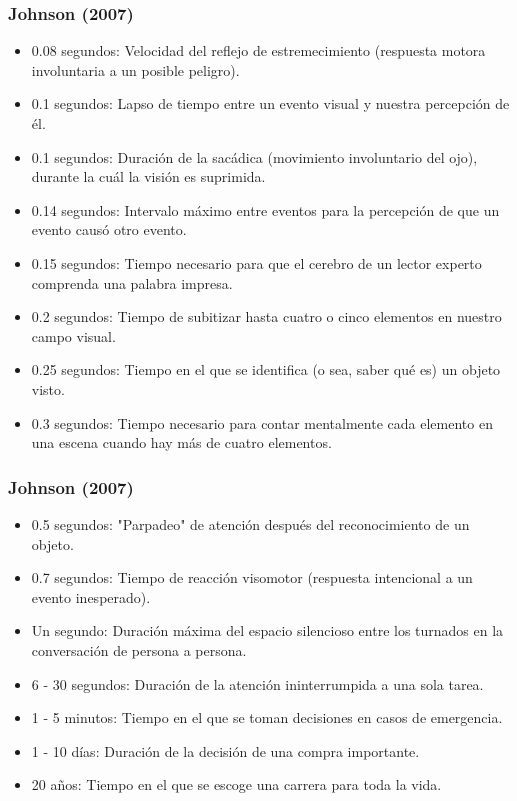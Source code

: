 \documentclass[11pt]{beamer}
\begin{document}
\begin{frame}
\frametitle{Johnson (2007)}
\begin{itemize}
\par
    \par
    \justify
    \color{black}
    \begin{itemize}
    \item 0.08 segundos: Velocidad del reflejo de estremecimiento (respuesta motora involuntaria a un posible peligro).
    \item  0.1 segundos: Lapso de tiempo entre un evento visual y nuestra percepción de él.
    \item 0.1 segundos: Duración de la sacádica (movimiento involuntario del ojo), durante la cuál la visión es suprimida.
    \item 0.14 segundos: Intervalo máximo entre eventos para la percepción de que un evento causó otro evento.
    \item 0.15 segundos: Tiempo necesario para que el cerebro de un lector experto comprenda una palabra impresa.
    \item 0.2 segundos: Tiempo de subitizar hasta cuatro o cinco elementos en nuestro campo visual. 
    \item 0.25 segundos: Tiempo en el que se identifica (o sea, saber qué es) un objeto visto.
    \item 0.3 segundos: Tiempo necesario para contar mentalmente cada elemento en una escena cuando hay más de cuatro elementos.
    
    \end{itemize}
\end{itemize}
\end{frame}

\begin{frame}
\frametitle{Johnson (2007)}
\begin{itemize}
\par
    \par
    \justify
    \color{black}
    \begin{itemize}
    \item 0.5 segundos: "Parpadeo" de atención después del reconocimiento de un objeto.
    \item 0.7 segundos: Tiempo de reacción visomotor (respuesta intencional a un evento inesperado).
    \item Un segundo: Duración máxima del espacio silencioso entre los turnados en la conversación de persona a persona.
    \item 6 - 30 segundos: Duración de la atención ininterrumpida a una sola tarea.
    \item 1 - 5 minutos: Tiempo en el que se toman decisiones en casos de emergencia.
    \item 1 - 10 días: Duración de la decisión de una compra importante.
    \item 20 años: Tiempo en el que se escoge una carrera para toda la vida.

    \end{itemize}
    
\end{itemize}
\end{frame}
\end{document}
